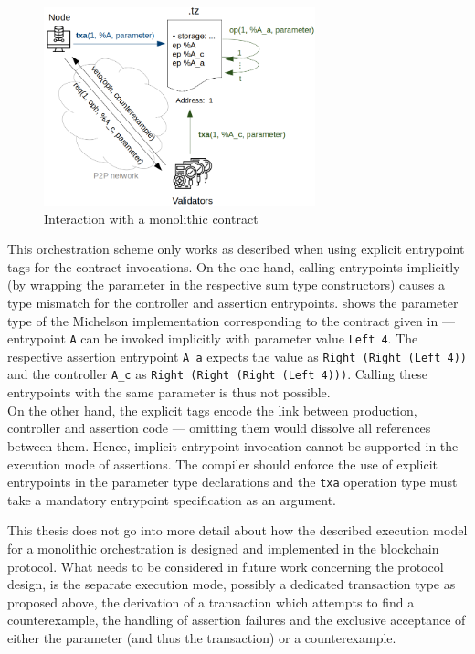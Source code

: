 \begin{figure}
\centering
  \includegraphics[width=0.7\textwidth]{figures/5-offline_tezos/interaction_monolithic_2}
	\caption{Interaction with a monolithic contract}
	\label{fig:interaction_monolithic}
\end{figure}

This orchestration scheme only works as described when using explicit entrypoint tags for the contract invocations. On the one hand, calling entrypoints implicitly (by wrapping the parameter in the respective sum type constructors) causes a type mismatch for the controller and assertion entrypoints.  shows the parameter type of the Michelson implementation corresponding to the contract given in  --- entrypoint \texttt{A} can be invoked implicitly with parameter value \texttt{Left 4}. The respective assertion entrypoint \texttt{A\_a} expects the value as \texttt{Right (Right (Left 4))} and the controller \texttt{A\_c} as \texttt{Right (Right (Right (Left 4)))}. Calling these entrypoints with the same parameter is thus not possible. \\
On the other hand, the explicit tags encode the link between production, controller and assertion code --- omitting them would dissolve all references between them. Hence, implicit entrypoint invocation cannot be supported in the execution mode of assertions. The compiler should enforce the use of explicit entrypoints in the parameter type declarations and the \texttt{txa} operation type must take a mandatory entrypoint specification as an argument.

This thesis does not go into more detail about how the described execution model for a monolithic orchestration is designed and implemented in the blockchain protocol. What needs to be considered in future work concerning the protocol design, is the separate execution mode, possibly a dedicated transaction type as proposed above, the derivation of a transaction which attempts to find a counterexample, the handling of assertion failures and the exclusive acceptance of either the parameter (and thus the transaction) or a counterexample.


